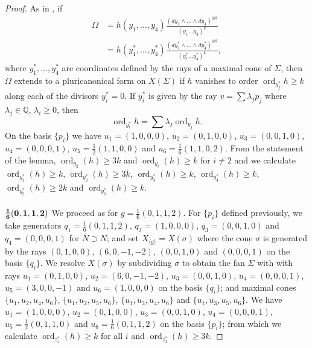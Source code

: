 \documentclass[12pt, a4paper]{article}
\newcommand{\QQ}{\mathbb{Q}}
\newcommand{\la}{\langle}
\newcommand{\ra}{\rangle}
\newcommand{\opn}{\operatorname}
\begin{document}
\begin{proof}
  As in \cite{Tai}, if 
  \begin{align*}
    \Omega
    & = h(y_1, \ldots, y_4) \frac{ (dy_1 \wedge \ldots \wedge dy_4)^{\otimes k}}{(y_1 \ldots y_4)^k} \\
    & = h(y_1^*, \ldots, y_4^*) \frac{ (dy_1^* \wedge \ldots \wedge dy_4^*)^{\otimes k}}{(y_1^* \ldots y_4^*)^k}, 
  \end{align*}
  where $y_1^*, \ldots, y_4^*$ are coordinates defined by the rays of a maximal cone of $\Sigma$,
  then $\Omega$ extends to a pluricanonical form on $X(\Sigma)$ if $h$ vanishes to order $\opn{ord}_{y_j^*} h \geq k$ along each of the divisors $y_i^*=0$.
If $y_i^*$ is given by the ray
  $v = \sum \lambda_j p_j$ where $\lambda_j \in \QQ$, $\lambda_i \geq 0$, then
  \[
    \opn{ord}_{y_i^*} h =
    \sum \lambda_j \opn{ord}_{y_j} h. 
  \]
On the basis $\{p_i\}$ we have
  $u_1 = (1,0,0,0)$,
  $u_2 = (0,1,0,0)$,
  $u_3 = (0,0,1,0)$,
  $u_4 = (0,0,0,1)$,
  $u_5=\frac{1}{2}(1,1,0,0)$ and
  $u_6 = \frac{1}{6}(1,1,0,2)$.
  From the statement of the lemma,  $\opn{ord}_{y_2}(h) \geq 3k$ and $\opn{ord}_{y_i}(h) \geq k$ for $i \neq 2$ and we calculate
  $\opn{ord}_{y_1^*}(h) \geq k$, 
  $\opn{ord}_{y_2^*}(h) \geq 3k$, 
  $\opn{ord}_{y_3^*}(h) \geq k$, 
  $\opn{ord}_{y_4^*}(h) \geq k$, 
  $\opn{ord}_{y_5^*}(h) \geq 2k$ 
  and 
  $\opn{ord}_{y_6^*}(h) \geq k$.
  \\
  \\
\noindent $\bold{\frac{1}{6}(0,1,1,2)}$
We proceed as for $g=\frac{1}{6}(0,1,1,2)$. 
For $\{p_i\}$ defined previously, we take generators 
$q_1 = \frac{1}{6}(0,1,1,2)$,
$q_2=(1,0,0,0)$,
$q_3=(0,0,1,0)$ and
$q_4 = (0,0,0,1)$ for $\overline{N} \supset N$; and set $X_{\la g \ra} = X(\sigma)$ where the cone $\sigma$ is generated by the rays
$(0,1,0,0)$,
$(6,0,-1,-2)$,
$(0,0,1,0)$ and
$(0,0,0,1)$ on the basis $\{q_i\}$. 
We resolve $X(\sigma)$ by subdividing $\sigma$ to obtain the fan $\Sigma$ with with rays
$u_1=(0,1,0,0)$,
$u_2=(6,0,-1,-2)$,
$u_3=(0,0,1,0)$,
$u_4=(0,0,0,1)$,
$u_5=(3,0,0,-1)$ and
$u_6=(1,0,0,0)$ on the basis $\{q_i\}$;
and maximal cones
$\{u_1, u_2, u_4, u_6\}$,
$\{u_1, u_2, u_5, u_6 \}$,
$\{u_1, u_3, u_4, u_6 \}$ 
and 
$\{u_1, u_3, u_5, u_6 \}$.
We have
$u_1=(1,0,0,0)$,
$u_2=(0,1,0,0)$,
$u_3=(0,0,1,0)$,
$u_4=(0,0,0,1)$,
$u_5=\frac{1}{2}(0,1,1,0)$ and
$u_6 = \frac{1}{6}(0,1,1,2)$ on the basis $\{p_i\}$;
from which we calculate 
$\opn{ord}_{z_i^*}(h) \geq k$ for all $i$ and
$\opn{ord}_{z_2^*}(h) \geq 3k$.


\end{proof}
\end{document}
